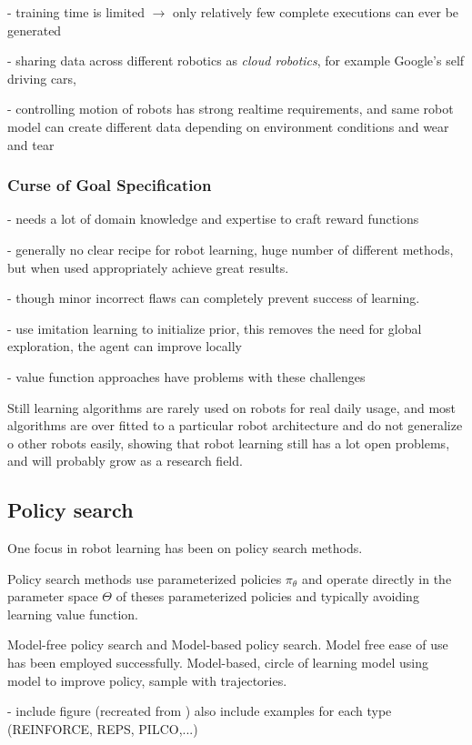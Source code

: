 - training time is limited $\rightarrow$ only relatively few complete executions can ever be generated

- sharing data across different robotics as \textit{cloud robotics}, for example Google's self
driving cars,

-  controlling motion of robots has strong realtime requirements, and
same robot model can create different data depending on environment conditions and
wear and tear

\subsubsection{Curse of Goal Specification}
- needs a lot of domain knowledge and expertise to craft reward functions


  - generally no clear recipe for robot learning, huge number of different methods,
  but when used appropriately achieve great results.

  - though minor incorrect flaws can completely prevent success of learning.

  - use imitation learning to initialize prior, this removes the need for global exploration,
  the agent can improve locally

  - value function approaches have problems with these challenges
  
Still learning algorithms are rarely used on robots for real daily usage, and most
algorithms are over fitted to a particular robot architecture and do not generalize
o other robots easily, showing that robot learning still has a lot open problems,
and will probably grow as a research field.

\subsection{Policy search}
One focus in robot learning has been on policy search methods.

Policy search methods use parameterized policies $\pi_{\theta}$ and operate
directly in the parameter space $\Theta$ of theses parameterized policies and
typically avoiding learning value function.

Model-free policy search and Model-based policy search.
Model free ease of use has been employed successfully.
Model-based, circle of learning model using model to improve policy,
sample with trajectories.

- include figure (recreated from \citet{deisenroth2013survey})
  also include examples for each type (REINFORCE, REPS, PILCO,...)

